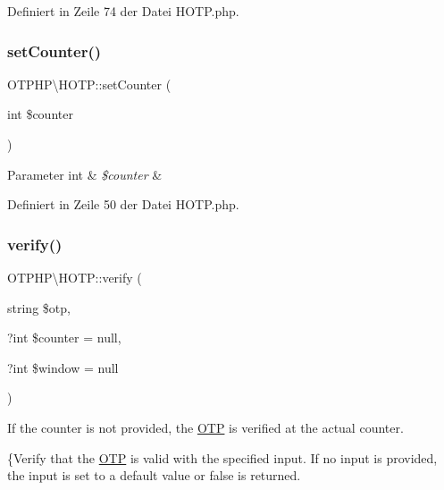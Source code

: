 Definiert in Zeile 74 der Datei H\+O\+T\+P.\+php.

\mbox{\label{class_o_t_p_h_p_1_1_h_o_t_p_a2928f5f41646e545b4b93d82e3cc955e}} 
\subsubsection{\texorpdfstring{set\+Counter()}{setCounter()}}
{\footnotesize\ttfamily O\+T\+P\+H\+P\textbackslash{}\+H\+O\+T\+P\+::set\+Counter (\begin{DoxyParamCaption}\item[{int}]{\$counter }\end{DoxyParamCaption})\hspace{0.3cm}{\ttfamily [protected]}}


\begin{DoxyParams}[1]{Parameter}
int & {\em \$counter} & \\
\hline
\end{DoxyParams}


Definiert in Zeile 50 der Datei H\+O\+T\+P.\+php.

\mbox{\label{class_o_t_p_h_p_1_1_h_o_t_p_a9d72e9295aa6f1e7df15a1abfef96683}} 
\subsubsection{\texorpdfstring{verify()}{verify()}}
{\footnotesize\ttfamily O\+T\+P\+H\+P\textbackslash{}\+H\+O\+T\+P\+::verify (\begin{DoxyParamCaption}\item[{string}]{\$otp,  }\item[{?int}]{\$counter = {\ttfamily null},  }\item[{?int}]{\$window = {\ttfamily null} }\end{DoxyParamCaption})}

If the counter is not provided, the \mbox{\hyperlink{class_o_t_p_h_p_1_1_o_t_p}{O\+TP}} is verified at the actual counter.

\{Verify that the \mbox{\hyperlink{class_o_t_p_h_p_1_1_o_t_p}{O\+TP}} is valid with the specified input. If no input is provided, the input is set to a default value or false is returned.


